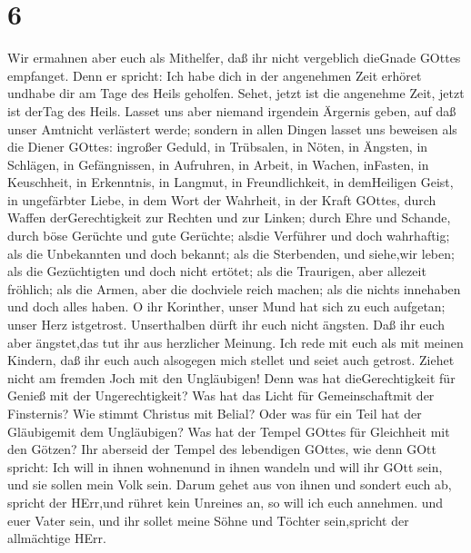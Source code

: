 \hypertarget{section-5}{%
\section{6}\label{section-5}}

 Wir ermahnen aber euch als Mithelfer, daß ihr nicht
vergeblich dieGnade GOttes empfanget.  Denn er spricht: Ich
habe dich in der angenehmen Zeit erhöret undhabe dir am Tage des Heils
geholfen. Sehet, jetzt ist die angenehme Zeit, jetzt ist derTag des
Heils.  Lasset uns aber niemand irgendein Ärgernis geben,
auf daß unser Amtnicht verlästert werde;  sondern in allen
Dingen lasset uns beweisen als die Diener GOttes: ingroßer Geduld, in
Trübsalen, in Nöten, in Ängsten,  in Schlägen, in
Gefängnissen, in Aufruhren, in Arbeit, in Wachen, inFasten, 
in Keuschheit, in Erkenntnis, in Langmut, in Freundlichkeit, in
demHeiligen Geist, in ungefärbter Liebe,  in dem Wort der
Wahrheit, in der Kraft GOttes, durch Waffen derGerechtigkeit zur Rechten
und zur Linken;  durch Ehre und Schande, durch böse Gerüchte
und gute Gerüchte; alsdie Verführer und doch wahrhaftig; 
als die Unbekannten und doch bekannt; als die Sterbenden, und siehe,wir
leben; als die Gezüchtigten und doch nicht ertötet;  als
die Traurigen, aber allezeit fröhlich; als die Armen, aber die dochviele
reich machen; als die nichts innehaben und doch alles haben.
 O ihr Korinther, unser Mund hat sich zu euch aufgetan;
unser Herz istgetrost.  Unserthalben dürft ihr euch nicht
ängsten. Daß ihr euch aber ängstet,das tut ihr aus herzlicher Meinung.
 Ich rede mit euch als mit meinen Kindern, daß ihr euch
auch alsogegen mich stellet und seiet auch getrost.  Ziehet
nicht am fremden Joch mit den Ungläubigen! Denn was hat dieGerechtigkeit
für Genieß mit der Ungerechtigkeit? Was hat das Licht für
Gemeinschaftmit der Finsternis?  Wie stimmt Christus mit
Belial? Oder was für ein Teil hat der Gläubigemit dem Ungläubigen?
 Was hat der Tempel GOttes für Gleichheit mit den Götzen?
Ihr aberseid der Tempel des lebendigen GOttes, wie denn GOtt spricht:
Ich will in ihnen wohnenund in ihnen wandeln und will ihr GOtt sein, und
sie sollen mein Volk sein.  Darum gehet aus von ihnen und
sondert euch ab, spricht der HErr,und rühret kein Unreines an, so will
ich euch annehmen.  und euer Vater sein, und ihr sollet
meine Söhne und Töchter sein,spricht der allmächtige HErr.


